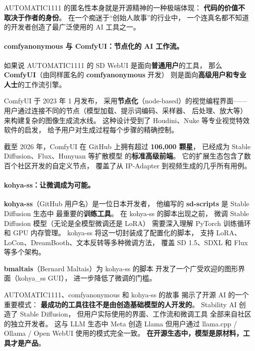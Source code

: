 AUTOMATIC1111 的匿名性本身就是开源精神的一种极端体现：
\textbf{代码的价值不取决于作者的身份}。
在一个痴迷于``创始人故事''的行业中，
一个连真名都不知道的开发者创造了最广泛使用的 AI 工具之一。

\paragraph{comfyanonymous 与 ComfyUI：节点化的 AI 工作流。}
如果说 AUTOMATIC1111 的 SD WebUI 是面向\textbf{普通用户}的工具，
那么 \textbf{ComfyUI}（由同样匿名的 \textbf{comfyanonymous} 开发）
则是面向\textbf{高级用户和专业人士}的工作流引擎。

ComfyUI 于 2023 年 1 月发布，
采用\textbf{节点化}（node-based）的视觉编程界面——
用户通过连接不同的节点（模型加载、提示词编码、采样器、
后处理、放大等）来构建复杂的图像生成流水线。
这种设计受到了 Houdini、Nuke 等专业视觉特效软件的启发，
给予用户对生成过程每个步骤的精确控制。

截至 2026 年，ComfyUI 在 GitHub 上拥有超过 \textbf{106,000 颗星}，
已经成为 Stable Diffusion、Flux、Hunyuan 等扩散模型
的\textbf{标准高级前端}。
它的扩展生态包含了数百个社区开发的自定义节点，
覆盖了从 IP-Adapter 到视频生成的几乎所有用例。

\paragraph{kohya-ss：让微调成为可能。}
\textbf{kohya-ss}（GitHub 用户名）是一位日本开发者，
他编写的 \textbf{sd-scripts} 是 Stable Diffusion 生态中
最重要的\textbf{训练工具}。
在 kohya-ss 的脚本出现之前，
微调 Stable Diffusion 模型（无论是全模型微调还是 LoRA）
需要深入理解 PyTorch 训练循环和 GPU 内存管理。
kohya-ss 将这一切封装成了配置化的脚本，
支持 LoRA、LoCon、DreamBooth、文本反转等多种微调方法，
覆盖 SD 1.5、SDXL 和 Flux 等多个架构。

\textbf{bmaltais}（Bernard Maltais）为 kohya-ss 的脚本
开发了一个广受欢迎的图形界面（kohya\_ss GUI），
进一步降低了微调的门槛。

\begin{corebox}[AI 生成艺术工具链的启示]
AUTOMATIC1111、comfyanonymous 和 kohya-ss 的故事
揭示了开源 AI 的一个重要模式：
\textbf{最成功的工具往往不是由创造基础模型的人开发的}。
Stability AI 创造了 Stable Diffusion，
但用户实际使用的界面、工作流和微调工具
全部来自社区的独立开发者。
这与 LLM 生态中 Meta 创造 Llama
但用户通过 llama.cpp / Ollama / Open WebUI 使用的模式完全一致。
\textbf{在开源生态中，模型是原材料，工具才是产品}。
\end{corebox}


